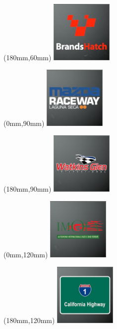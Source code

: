 \begin{textblock*}{30mm}(180mm,60mm)%
\includegraphics[width=30mm]{LG/2015-05-20_00074.png}
\end{textblock*}
\begin{textblock*}{30mm}(0mm,90mm)%
\includegraphics[width=30mm]{LG/2015-05-20_00085.png}
\end{textblock*}
\begin{textblock*}{30mm}(180mm,90mm)%
\includegraphics[width=30mm]{LG/2015-05-20_00097.png}
\end{textblock*}
\begin{textblock*}{30mm}(0mm,120mm)%
\includegraphics[width=30mm]{LG/2015-05-20_00083.png}
\end{textblock*}
\begin{textblock*}{30mm}(180mm,120mm)%
\includegraphics[width=30mm]{LG/2015-05-20_00077.png}
\end{textblock*}
